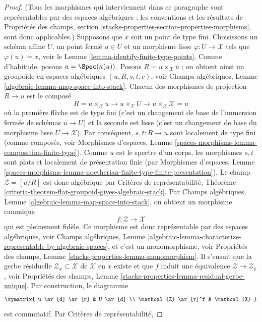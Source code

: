 \begin{proof}
(Tous les morphismes qui interviennent dans ce paragraphe sont représentables
par des espaces algébriques ; les conventions et les résultats de
Propriétés des champs,
section \ref{stacks-properties-section-properties-morphisms},
sont donc applicables.)
Supposons que $x$ soit un point de type fini. Choisissons un schéma affine
$U$, un point fermé $u \in U$ et un morphisme lisse
$\varphi : U \to \mathcal{X}$ tels que $\varphi(u) = x$, voir le
Lemme \ref{lemma-identify-finite-type-points}.
Comme d'habitude, posons $u = \Spec(\kappa(u))$. Posons
$R = u \times_\mathcal{X} u$ ; on obtient ainsi un groupoïde en espaces
algébriques $(u, R, s, t, c)$, voir Champs algébriques,
Lemme \ref{algebraic-lemma-map-space-into-stack}.
Chacun des morphismes de projection $R \to u$ est le composé
$$
R = u \times_\mathcal{X} u \to
u \times_\mathcal{X} U \to
u \times_\mathcal{X} \mathcal{X} = u
$$
où la première flèche est de type fini (c'est un changement de base de
l'immersion fermée de schémas $u \to U$) et la seconde est lisse (c'est un
changement de base du morphisme lisse $U \to \mathcal{X}$). Par conséquent,
$s, t : R \to u$ sont localement de type fini (comme composés, voir
Morphismes d'espaces,
Lemme \ref{spaces-morphisms-lemma-composition-finite-type}).
Comme $u$ est le spectre d'un corps, les morphismes $s, t$ sont plats et localement de
présentation finie (par Morphismes d'espaces, Lemme
\ref{spaces-morphisms-lemma-noetherian-finite-type-finite-presentation}).
Le champ $\mathcal{Z} = [u/R]$ est donc algébrique par Critères de
représentabilité,
Théorème \ref{criteria-theorem-flat-groupoid-gives-algebraic-stack}.
Par Champs algébriques,
Lemme \ref{algebraic-lemma-map-space-into-stack},
on obtient un morphisme canonique
$$
f : \mathcal{Z} \longrightarrow \mathcal{X}
$$
qui est pleinement fidèle. Ce morphisme est donc représentable par des espaces
algébriques, voir Champs algébriques, Lemme
\ref{algebraic-lemma-characterize-representable-by-algebraic-spaces},
et c'est un monomorphisme, voir Propriétés des champs,
Lemme \ref{stacks-properties-lemma-monomorphism}.
Il s'ensuit que la gerbe résiduelle
$\mathcal{Z}_x \subset \mathcal{X}$ de $\mathcal{X}$ en $x$ existe et que
$f$ induit une équivalence $\mathcal{Z} \to \mathcal{Z}_x$, voir
Propriétés des champs,
Lemme \ref{stacks-properties-lemma-residual-gerbe-unique}.
Par construction, le diagramme
$$
\xymatrix{
u \ar[d] \ar[r] & U \ar[d] \\
\mathcal{Z} \ar[r]^f & \mathcal{X}
}
$$
est commutatif. Par Critères de représentabilité,

\end{proof}
